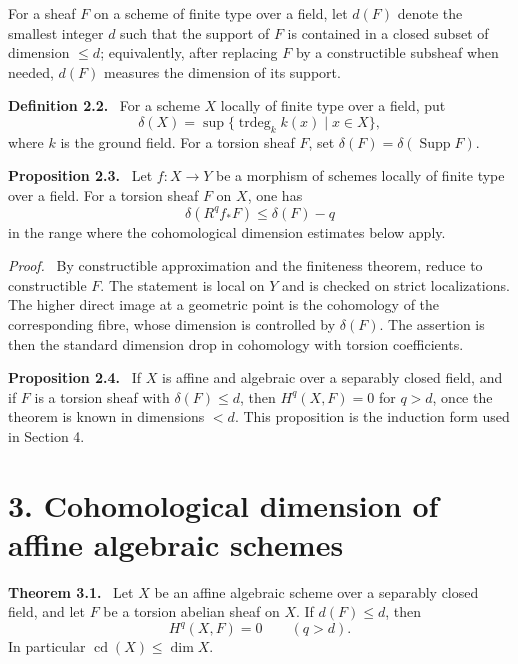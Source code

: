 \documentclass[12pt]{article}
\newcommand{\Supp}{\operatorname{Supp}}
\newenvironment{statement}[1]{\par\medskip\noindent\textbf{#1.}\ }{\par\medskip}
\newenvironment{prooftext}[1][Proof]{\par\noindent\emph{#1.}\ }{\par\medskip}
\begin{document}
For a sheaf \(F\) on a scheme of finite type over a field, let \(d(F)\) denote the smallest integer \(d\) such that the support of \(F\) is contained in a closed subset of dimension \(\le d\); equivalently, after replacing \(F\) by a constructible subsheaf when needed, \(d(F)\) measures the dimension of its support.

\begin{statement}{Definition 2.2}
For a scheme \(X\) locally of finite type over a field, put
\[
\delta(X)=\sup\{\operatorname{trdeg}_{k} k(x)\mid x\in X\},
\]
where \(k\) is the ground field. For a torsion sheaf \(F\), set \(\delta(F)=\delta(\Supp F)\).
\end{statement}

\begin{statement}{Proposition 2.3}
Let \(f:X\to Y\) be a morphism of schemes locally of finite type over a field. For a torsion sheaf \(F\) on \(X\), one has
\[
\delta(R^qf_*F)\le \delta(F)-q
\]
in the range where the cohomological dimension estimates below apply.
\end{statement}

\begin{prooftext}
By constructible approximation and the finiteness theorem, reduce to constructible \(F\). The statement is local on \(Y\) and is checked on strict localizations. The higher direct image at a geometric point is the cohomology of the corresponding fibre, whose dimension is controlled by \(\delta(F)\). The assertion is then the standard dimension drop in cohomology with torsion coefficients.
\end{prooftext}

\begin{statement}{Proposition 2.4}
If \(X\) is affine and algebraic over a separably closed field, and if \(F\) is a torsion sheaf with \(\delta(F)\le d\), then \(H^q(X,F)=0\) for \(q>d\), once the theorem is known in dimensions \(<d\). This proposition is the induction form used in Section 4.
\end{statement}

\section*{3. Cohomological dimension of affine algebraic schemes}

\begin{statement}{Theorem 3.1}
Let \(X\) be an affine algebraic scheme over a separably closed field, and let \(F\) be a torsion abelian sheaf on \(X\). If \(d(F)\le d\), then
\[
H^q(X,F)=0\qquad(q>d).
\]
In particular \(\operatorname{cd}(X)\le\dim X\).
\end{statement}
\end{document}
